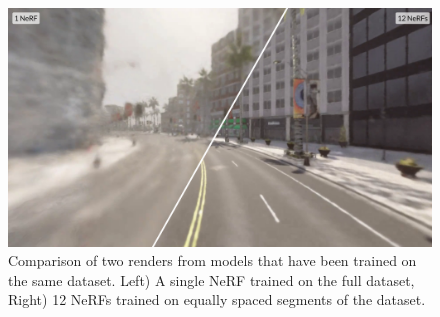\begin{figure}[!h]
    \centering
    \includegraphics[width=1.0\textwidth]{figures/block-nerf-comparison.png}
    \caption[Comparison of regular NeRF vs. Block-NeRF approach]{Comparison of two renders from models that have been trained on the same dataset. Left) A single NeRF trained on the full dataset, Right) 12 NeRFs trained on equally spaced segments of the dataset.}
    \label{fig:block-nerf-comparison}
\end{figure}
